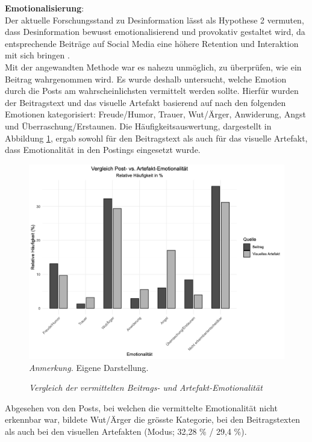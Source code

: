 \documentclass[12pt,a4paper]{article}        %
\begin{document}
\textbf{Emotionalisierung}:\\
Der aktuelle Forschungsstand zu Desinformation lässt als Hypothese 2 vermuten, dass Desinformation bewusst emotionalisierend und provokativ gestaltet wird, da entsprechende Beiträge auf Social Media eine höhere Retention und Interaktion mit sich bringen \parencites[vgl.\ dazu][8]{burkhardt_history_2017}[42]{levak_disinformation_2020}[18]{grujic_warnhinweise_2024}[5]{tandoc_jr_facts_2019}[170]{wahl_fake_2021}. \\
Mit der angewandten Methode war es nahezu unmöglich, zu überprüfen, wie ein Beitrag wahrgenommen wird. Es wurde deshalb untersucht, welche Emotion durch die Posts am wahrscheinlichsten vermittelt werden sollte. Hierfür wurden der Beitragstext und das visuelle Artefakt basierend auf \textcite[1164]{russell_circumplex_1980} nach den folgenden Emotionen kategorisiert: Freude/Humor, Trauer, Wut/Ärger, Anwiderung, Angst und Überraschung/Erstaunen.
Die Häufigkeitsauswertung, dargestellt in Abbildung \ref{fig:results_sentiment_plot}, ergab sowohl für den Beitragstext als auch für das visuelle Artefakt, dass Emotionalität in den Postings eingesetzt wurde.

\begin{figure}[H]
  \caption{\textit{Vergleich der vermittelten Beitrags- und Artefakt-Emotionalität}}
  \label{fig:results_sentiment_plot}
  \centering
  \includegraphics[width=1\linewidth]{images/sentiment_plot.png}
  \footnotesize\textit{Anmerkung.} Eigene Darstellung.
\end{figure}
Abgesehen von den Posts, bei welchen die vermittelte Emotionalität nicht erkennbar war, bildete Wut/Ärger die grösste Kategorie, bei den Beitragstexten als auch bei den visuellen Artefakten (Modus; 32,28 \% / 29,4 \%).
\end{document}
